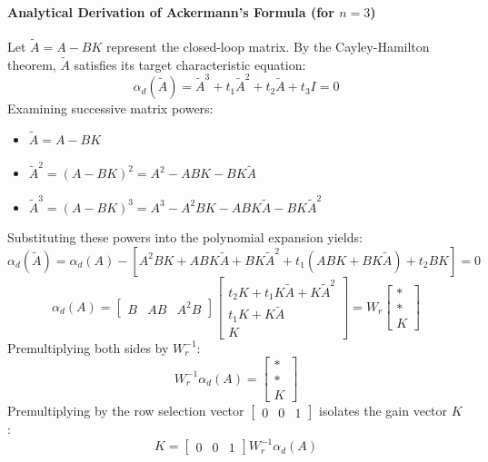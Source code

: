 \documentclass[12pt,onecolumn,twoside ]{article}
\begin{document}
	\paragraph{Analytical Derivation of Ackermann’s Formula (for $n = 3$)}
	Let $\tilde{A} = A - BK$ represent the closed-loop matrix. By the Cayley-Hamilton theorem, $\tilde{A}$ satisfies its target characteristic equation: \[
	\alpha_d(\tilde{A}) = \tilde{A}^3 + t_1 \tilde{A}^2 + t_2 \tilde{A} + t_3 I = 0
	\]
	Examining successive matrix powers:
	\begin{itemize}
		\item
		$\tilde{A} = A - BK$
		\item
		$\tilde{A}^2 = (A - BK)^2 = A^2 - ABK - BK\tilde{A}$
		\item
		$\tilde{A}^3 = (A - BK)^3 = A^3 - A^2 BK - ABK\tilde{A} - BK\tilde{A}^2$
	\end{itemize}
	Substituting these powers into the polynomial expansion yields: \[
	\alpha_d(\tilde{A}) = \alpha_d(A) - \left[ A^2 BK + ABK\tilde{A} + BK\tilde{A}^2 + t_1(ABK + BK\tilde{A}) + t_2 BK \right] = 0
	\] \[
	\alpha_d(A) = \begin{bmatrix} B & AB & A^2 B \end{bmatrix} \begin{bmatrix} t_2 K + t_1 K\tilde{A} + K\tilde{A}^2 \\ t_1 K + K\tilde{A} \\ K \end{bmatrix} = W_r \begin{bmatrix} * \\ * \\ K \end{bmatrix}
	\]
	Premultiplying both sides by $W_r^{-1}$: \[
	W_r^{-1} \alpha_d(A) = \begin{bmatrix} * \\ * \\ K \end{bmatrix}
	\] Premultiplying by the row selection vector $\begin{bmatrix} 0 & 0 & 1 \end{bmatrix}$ isolates the gain vector $K$: \[
	K = \begin{bmatrix} 0 & 0 & 1 \end{bmatrix} W_r^{-1} \alpha_d(A)
	\]
	
\end{document}
